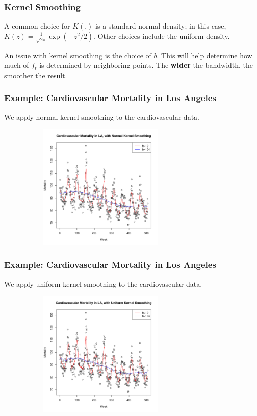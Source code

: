 \documentclass[%
xcolor=pdftex]{beamer}
\begin{document}
\begin{frame}
\frametitle{Kernel Smoothing}

A common choice for $K(.)$ is a standard normal density; in this case, $K(z) = \frac{1}{\sqrt{2\pi}} \exp(-z^2/2)$.  Other choices include the uniform density. \\

\vspace{5mm}

An issue with kernel smoothing is the choice of $b$.  This will help determine how much of $f_t$ is determined by neighboring points. The \textbf{wider} the bandwidth, the smoother the result.

\end{frame}

\begin{frame}
\frametitle{Example: Cardiovascular Mortality in Los Angeles}

We apply normal kernel smoothing to the cardiovascular data.

\includegraphics[width=100mm, height=60mm]{kernel_normal.pdf}

\end{frame}

\begin{frame}
\frametitle{Example: Cardiovascular Mortality in Los Angeles}

We apply uniform kernel smoothing to the cardiovascular data.

\includegraphics[width=100mm, height=60mm]{kernel_u.pdf}

\end{frame}
\end{document}
